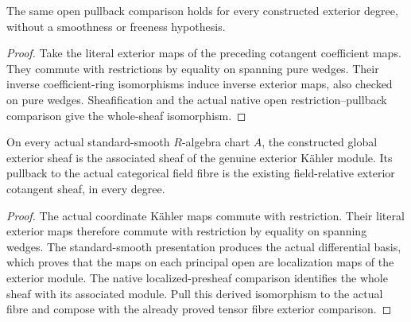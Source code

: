 \begin{lemma}
\label{lem:kn-arithmetic-global-exterior-restriction}
\leanok
{}
The same open pullback comparison holds for every constructed exterior
degree, without a smoothness or freeness hypothesis.
\end{lemma}
\begin{proof}
Take the literal exterior maps of the preceding cotangent coefficient maps.
They commute with restrictions by equality on spanning pure wedges.  Their
inverse coefficient-ring isomorphisms induce inverse exterior maps, also
checked on pure wedges.  Sheafification and the actual native open
restriction--pullback comparison give the whole-sheaf isomorphism.
\end{proof}

\begin{lemma}
\label{lem:kn-arithmetic-global-affine-exterior}
\leanok
{}
On every actual standard-smooth $R$-algebra chart $A$, the constructed global
exterior sheaf is the associated sheaf of the genuine exterior K\"ahler
module.  Its pullback to the actual categorical field fibre is the existing
field-relative exterior cotangent sheaf, in every degree.
\end{lemma}
\begin{proof}
The actual coordinate K\"ahler maps commute with restriction.  Their literal
exterior maps therefore commute with restriction by equality on spanning
wedges.  The standard-smooth presentation produces the actual differential
basis, which proves that the maps on each principal open are localization
maps of the exterior module.  The native localized-presheaf comparison
identifies the whole sheaf with its associated module.  Pull this derived
isomorphism to the actual fibre and compose with the already proved tensor
fibre exterior comparison.
\end{proof}

